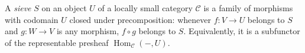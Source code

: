 
A \emph{sieve} $S$ on an object $U$ of a locally small category $\mathcal C$ is a family of morphisms with codomain $U$ closed under precomposition: whenever $f:V\to U$ belongs to $S$ and $g:W\to V$ is any morphism, $f\circ g$ belongs to $S$. Equivalently, it is a subfunctor of the representable presheaf $\operatorname{Hom}_{\mathcal C}(-,U)$.
